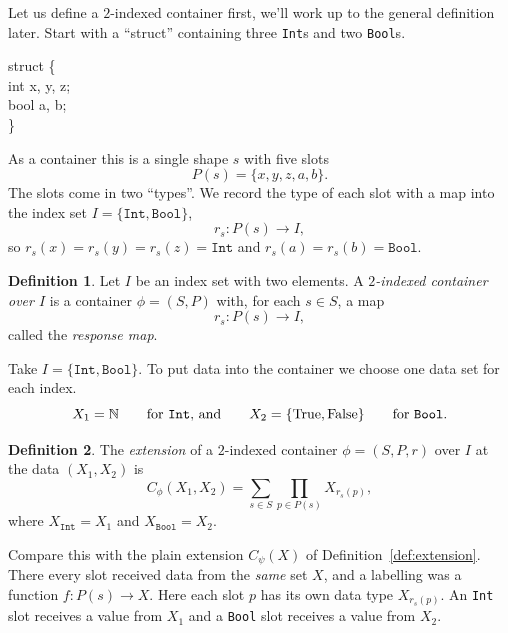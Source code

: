 \documentclass[11pt, a4paper]{article}
\theoremstyle{definition}
\newtheorem{definition}{Definition}[section]
\theoremstyle{plain}
\begin{document}
Let us define a $2$-indexed container first, we'll work up to the
general definition later.  Start with a ``struct'' containing three
\texttt{Int}s and two \texttt{Bool}s.
\begin{center}
\colorbox{gray!15}{\begin{minipage}{0.85\linewidth}
\ttfamily
struct \{\\
\hspace*{1.5em}int x, y, z;\\
\hspace*{1.5em}bool a, b;\\
\}
\end{minipage}}
\end{center}
As a container this is a single shape $s$ with five slots
\[
  P(s) = \{x, y, z, a, b\}.
\]
The slots come in two ``types''.  We record the type of each slot
with a map into the index set $I = \{\texttt{Int}, \texttt{Bool}\}$,
\[
  r_s : P(s) \to I,
\]
so $r_s(x) = r_s(y) = r_s(z) = \texttt{Int}$ and
$r_s(a) = r_s(b) = \texttt{Bool}$.

\medskip

\noindent\colorbox{gray!15}{\parbox{\dimexpr\linewidth-2\fboxsep}{%
\begin{definition}
Let $I$ be an index set with two elements.  A \emph{$2$-indexed
container over $I$} is a container $\phi = (S, P)$ with, for each
$s \in S$, a map
\[
  r_s : P(s) \to I,
\]
called the \emph{response map}.
\end{definition}%
}}

\medskip

Take $I = \{\texttt{Int}, \texttt{Bool}\}$.  To put data into the
container we choose one data set for each index.
\[
  X_1 = \mathbb{N}
  \qquad\text{for \texttt{Int}, and}\qquad
  X_2 = \{\mathrm{True}, \mathrm{False}\}
  \qquad\text{for \texttt{Bool}.}
\]

\noindent\colorbox{gray!15}{\parbox{\dimexpr\linewidth-2\fboxsep}{%
\begin{definition}
The \emph{extension} of a $2$-indexed container $\phi = (S, P, r)$
over $I$ at the data $(X_1, X_2)$ is
\[
  C_\phi(X_1, X_2) = \sum_{s \in S} \prod_{p \in P(s)} X_{r_s(p)},
\]
where $X_{\texttt{Int}} = X_1$ and $X_{\texttt{Bool}} = X_2$.
\end{definition}%
}}

\medskip

Compare this with the plain extension $C_\psi(X)$ of
Definition~\ref{def:extension}.  There every slot received data from
the \emph{same} set $X$, and a labelling was a function
$f : P(s) \to X$.  Here each slot $p$ has its own data type
$X_{r_s(p)}$.  An \texttt{Int} slot receives a value from $X_1$
and a \texttt{Bool} slot receives a value from $X_2$.
\end{document}
